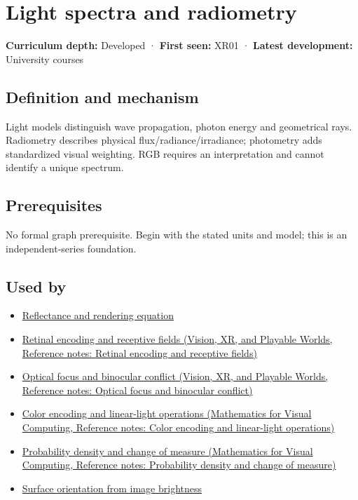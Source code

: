 \hypertarget{appendix-215c2570199b}{}\label{referencestart:appendix-215c2570199b}
\section{Light spectra and radiometry}\label{appendix-215c2570199b-light-spectra-and-radiometry}

\textbf{Curriculum depth:} Developed · \textbf{First seen:} XR01 · \textbf{Latest development:} University courses

\subsection{Definition and mechanism}\label{appendix-215c2570199b-definition-and-mechanism}

Light models distinguish wave propagation, photon energy and geometrical rays. Radiometry describes physical flux/radiance/irradiance; photometry adds standardized visual weighting. RGB requires an interpretation and cannot identify a unique spectrum.

\subsection{Prerequisites}\label{appendix-215c2570199b-prerequisites}

No formal graph prerequisite. Begin with the stated units and model; this is an independent-series foundation.

\subsection{Used by}\label{appendix-215c2570199b-used-by}

\begin{itemize}
\tightlist
\item
  \hyperref[appendix-96da0b153b77]{Reflectance and rendering equation}
\item
  \href{../07-Vision-XR-and-Playable-Worlds/main.pdf\#nameddest=appendix-7281c15ac44a}{Retinal encoding and receptive fields (Vision, XR, and Playable Worlds, Reference notes: Retinal encoding and receptive fields)}
\item
  \href{../07-Vision-XR-and-Playable-Worlds/main.pdf\#nameddest=appendix-f90cee1be7a4}{Optical focus and binocular conflict (Vision, XR, and Playable Worlds, Reference notes: Optical focus and binocular conflict)}
\item
  \href{../02-Mathematics-for-Visual-Computing/main.pdf\#nameddest=appendix-a9f83ad40792}{Color encoding and linear-light operations (Mathematics for Visual Computing, Reference notes: Color encoding and linear-light operations)}
\item
  \href{../02-Mathematics-for-Visual-Computing/main.pdf\#nameddest=appendix-4815cd87ab8b}{Probability density and change of measure (Mathematics for Visual Computing, Reference notes: Probability density and change of measure)}
\item
  \hyperref[appendix-89b2d5b7c9e1]{Surface orientation from image brightness}
\end{itemize}

